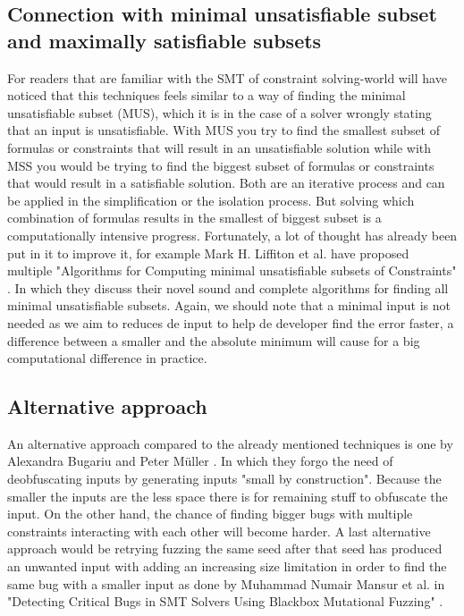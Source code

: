 \subsection{Connection with minimal unsatisfiable subset and maximally satisfiable subsets}
\label{inputReduction:MUS/MSS}
For readers that are familiar with the SMT of constraint solving-world will have noticed that this techniques feels similar to a way of finding the minimal unsatisfiable subset (MUS), which it is in the case of a solver wrongly stating that an input is unsatisfiable. 
With MUS you try to find the smallest subset of formulas or constraints that will result in an unsatisfiable solution while with 
MSS you would be trying to find the biggest subset of formulas or constraints that would result in a satisfiable solution. Both are an iterative process and can be applied in the simplification or the isolation process. But solving which combination of formulas results in the smallest of biggest subset is a computationally intensive progress. Fortunately, a lot of thought has already been put in it to improve it, for example Mark H. Liffiton et al. have proposed multiple "Algorithms for Computing minimal unsatisfiable subsets of Constraints" \cite{51liffiton2008algorithms}. In which they discuss their novel sound and complete algorithms for finding all minimal unsatisfiable subsets. Again, we should note that a minimal input is not needed as we aim to reduces de input to help de developer find the error faster, a difference between a smaller and the absolute minimum will cause for a big computational difference in practice.

\subsection{Alternative approach}
\label{inputReduction:alt2deobfuscating}
An alternative approach compared to the already mentioned techniques is one by Alexandra Bugariu and Peter M\"uller \cite{9bugariu2020automaticallyTestingStringSolvers}. In which they forgo the need of deobfuscating inputs by generating inputs "small by construction". 
Because the smaller the inputs are the less space there is for remaining stuff to obfuscate the input. On the other hand, the chance of finding bigger bugs with multiple constraints interacting with each other will become harder.
A last alternative approach would be retrying fuzzing the same seed after that seed has produced an unwanted input with adding an increasing size limitation in order to find the same bug with a smaller input as done by Muhammad Numair Mansur et al. in "Detecting Critical Bugs in SMT Solvers Using Blackbox Mutational Fuzzing" \cite{1mansur2020detecting}.

